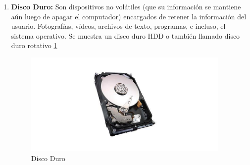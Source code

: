 \documentclass{article}
\begin{document}
\begin{enumerate}
\item \textbf{Disco Duro:} Son dispositivos no volátiles (que su información se mantiene aún luego de apagar el computador) encargados de retener la información del usuario. Fotografías, vídeos, archivos de texto, programas, e incluso, el sistema operativo.\cite{qloudea} Se muestra un disco duro HDD o también llamado disco duro rotativo \ref{fig:my_label} 
    \begin{figure}[h]
        \centering
        \includegraphics[width=10cm]{Disco Duro.jpg}
        \caption{Disco Duro}
        \label{fig:my_label}
    \end{figure}
\end{enumerate}
\end{document}
